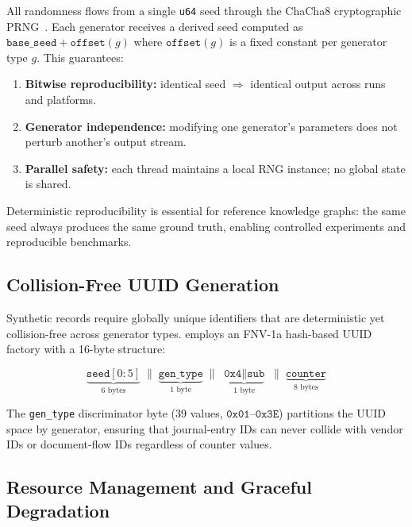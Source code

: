 All randomness flows from a single \texttt{u64} seed through the ChaCha8
cryptographic PRNG~\citep{bernstein2008chacha}.  Each generator receives
a derived seed computed as $\texttt{base\_seed} + \texttt{offset}(g)$
where $\texttt{offset}(g)$ is a fixed constant per generator type $g$.
This guarantees:

\begin{enumerate}
  \item \textbf{Bitwise reproducibility:} identical seed $\Rightarrow$
    identical output across runs and platforms.
  \item \textbf{Generator independence:} modifying one generator's
    parameters does not perturb another's output stream.
  \item \textbf{Parallel safety:} each thread maintains a local RNG
    instance; no global state is shared.
\end{enumerate}

Deterministic reproducibility is essential for reference knowledge
graphs: the same seed always produces the same ground truth, enabling
controlled experiments and reproducible benchmarks.

\subsection{Collision-Free UUID Generation}
\label{sec:arch_uuid}

Synthetic records require globally unique identifiers that are
deterministic yet collision-free across generator types.  \system{}
employs an FNV-1a hash-based UUID factory with a 16-byte structure:

\begin{equation}
\underbrace{\texttt{seed}[0{:}5]}_{\text{6 bytes}}
\;\|\;
\underbrace{\texttt{gen\_type}}_{\text{1 byte}}
\;\|\;
\underbrace{\texttt{0x4} \| \texttt{sub}}_{\text{1 byte}}
\;\|\;
\underbrace{\texttt{counter}}_{\text{8 bytes}}
\label{eq:uuid_structure}
\end{equation}

The \texttt{gen\_type} discriminator byte (39 values,
$\texttt{0x01}$--$\texttt{0x3E}$) partitions the UUID space by
generator, ensuring that journal-entry IDs can never collide with vendor
IDs or document-flow IDs regardless of counter values.

\subsection{Resource Management and Graceful Degradation}
\label{sec:arch_resources}

